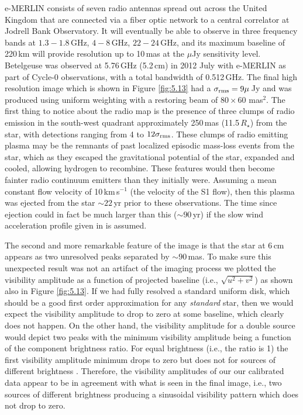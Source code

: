 e-MERLIN \citep{muxlow_2003} consists of seven radio antennas spread out across the United Kingdom that are connected via a fiber optic network to a central correlator at Jodrell Bank Observatory. It will eventually be able to observe in three frequency bands at $1.3-1.8$\,GHz, $4-8$\,GHz, $22-24$\,GHz, and its maximum baseline of 220\,km will provide resolution up to 10\,mas at the $\mu$Jy sensitivity level. Betelgeuse was observed at 5.76\,GHz (5.2\,cm) in 2012 July with e-MERLIN as part of Cycle-0 observations, with a total bandwidth of 0.512\,GHz. The final high resolution image which is shown in Figure \ref{fig:5.13} had a $\sigma _{\rm{rms}}=9\mu$\,Jy and was produced using uniform weighting with a restoring beam of $80\times 60$ mas$^2$. The first thing to notice about the radio map is the presence of three clumps of radio emission in the south-west quadrant approximately 250\,mas (11.5\,$R_{\star}$) from the star, with detections ranging from 4 to $12\sigma _{\rm{rms}}$. These clumps of radio emitting plasma may be the remnants of past localized episodic mass-loss events from the star, which as they escaped the gravitational potential of the star, expanded and cooled, allowing hydrogen to recombine. These features would then become fainter radio continuum emitters than they initially were. Assuming a mean constant flow velocity of 10\,km\,s$^{-1}$ (the velocity of the S1 flow), then this plasma was ejected from the star $\sim 22$\,yr prior to these observations. The time since ejection could in fact be much larger than this ($\sim 90$\,yr) if the slow wind acceleration profile given in \cite{harper_2001} is assumed.

The second and more remarkable feature of the image is that the star at 6\,cm appears as two unresolved peaks separated by $\sim 90$\,mas. To make sure this unexpected result was not an artifact of the imaging process we plotted the visibility amplitude as a function of projected baseline (i.e., $\sqrt{u^2 + v^2}$) as shown also in Figure \ref{fig:5.13}. If we had fully resolved a standard uniform disk, which should be a good first order approximation for any \textit{standard} star, then we would expect the visibility amplitude to drop to zero at some baseline, which clearly does not happen. On the other hand, the visibility amplitude for a double source would depict two peaks with the minimum visibility amplitude being a function of the component brightness ratio. For equal brightness (i.e., the ratio is 1) the first visibility amplitude minimum drops to zero but does not for sources of different brightness \citep{saha_2011}. Therefore, the visibility amplitudes of our our calibrated data appear to be in agreement with what is seen in the final image, i.e., two sources of different brightness producing a sinusoidal visibility pattern which does not drop to zero. 

